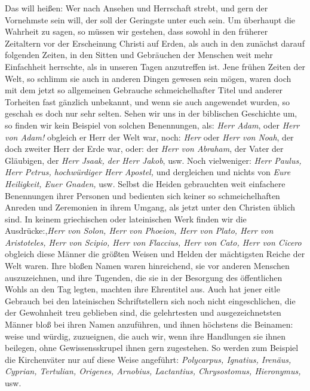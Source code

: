 Das will heißen: Wer nach Ansehen und
Herrschaft strebt, und gern der Vornehmste sein will, der soll der Geringste
unter euch sein. Um überhaupt die Wahrheit zu sagen, so müssen wir gestehen,
dass
sowohl in den früherer Zeitaltern vor der Erscheinung Christi auf Erden, als
auch in den zunächst darauf folgenden Zeiten, in den Sitten und Gebräuchen der
Menschen weit mehr Einfachheit herrschte, als in unseren Tagen anzutreffen ist.
Jene frühen Zeiten der Welt, so schlimm sie auch in anderen Dingen gewesen sein
mögen, waren doch mit dem jetzt so allgemeinen Gebrauche schmeichelhafter Titel
und anderer Torheiten fast gänzlich unbekannt, und wenn sie auch angewendet
wurden, so geschah es doch nur sehr selten. Sehen wir uns in der biblischen
Geschichte um, so finden wir kein Beispiel von solchen Benennungen, als:
\textit{Herr
Adam}, oder \textit{Herr von Adam!} obgleich er Herr der Welt war, noch:
\textit{Herr} oder
\textit{Herr von Noah}, der doch zweiter Herr der Erde war, oder: der
\textit{Herr von Abraham},
der Vater der Gläubigen, der \textit{Herr Jsaak, der Herr Jakob}, usw. Noch
vielweniger: \textit{Herr Paulus, Herr Petrus, hochwürdiger Herr Apostel,} und
dergleichen und
nichts von \textit{Eure Heiligkeit, Euer Gnaden,} usw. Selbst die Heiden
gebrauchten
weit einfachere Benennungen ihrer Personen und bedienten sich keiner so
schmeichelhaften Anreden und Zeremonien in ihrem Umgang, als jetzt unter den
Christen üblich sind. In keinem griechischen oder lateinischen Werk finden wir
die Ausdrücke:,\textit{Herr von Solon, Herr von Phoeion, Herr von Plato, Herr
von
Aristoteles, Herr von Scipio, Herr von Flaccius, Herr von Cato, Herr von Cicero}
obgleich diese Männer die größten Weisen und Helden der mächtigsten Reiche der
Welt waren. Ihre bloßen Namen waren hinreichend, sie vor anderen Menschen
auszuzeichnen, und ihre Tugenden, die sie in der Besorgung des öffentlichen
Wohls an den Tag legten, machten ihre Ehrentitel aus. Auch hat jener eitle
Gebrauch bei den lateinischen Schriftstellern sich noch nicht eingeschlichen,
die der Gewohnheit treu geblieben sind, die gelehrtesten und ausgezeichnetsten
Männer bloß bei ihren Namen anzuführen, und ihnen höchstens die Beinamen: weise
und würdig, zuzueignen, die auch wir, wenn ihre Handlungen sie ihnen beilegen,
ohne Gewissensskrupel ihnen gern zugestehen. So werden zum Beispiel die
Kirchenväter
nur auf diese Weise angeführt:
\textit{Polycarpus,
Ignatius, Irenäus,
Cyprian,
Tertulian, Origenes,
Arnobius, Lactantius,
Chrysostomus,
Hieronymus,} usw.
